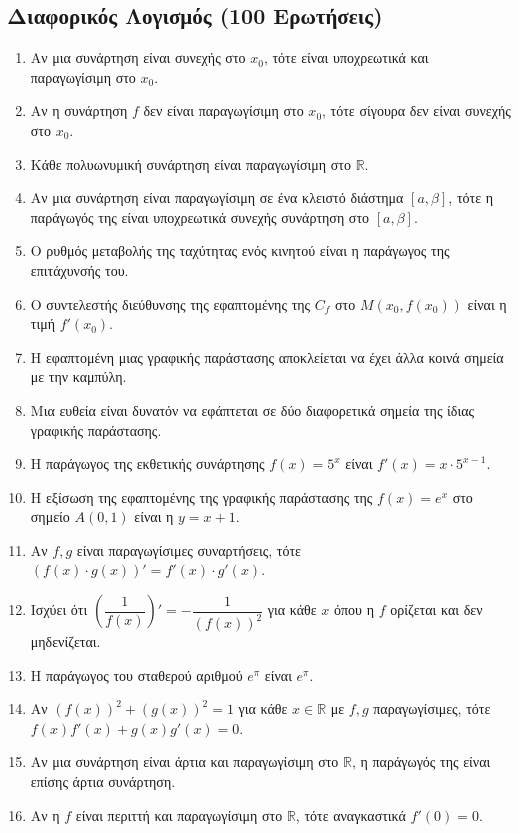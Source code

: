 \subsection{Διαφορικός Λογισμός (100 Ερωτήσεις)}
\begin{enumerate}[label=\textbf{2.\arabic*.}]
    \item Αν μια συνάρτηση είναι συνεχής στο $x_0$, τότε είναι υποχρεωτικά και παραγωγίσιμη στο $x_0$.
    \item Αν η συνάρτηση $f$ δεν είναι παραγωγίσιμη στο $x_0$, τότε σίγουρα δεν είναι συνεχής στο $x_0$.
    \item Κάθε πολυωνυμική συνάρτηση είναι παραγωγίσιμη στο $\mathbb{R}$.
    \item Αν μια συνάρτηση είναι παραγωγίσιμη σε ένα κλειστό διάστημα $[a, \beta]$, τότε η παράγωγός της είναι υποχρεωτικά συνεχής συνάρτηση στο $[a, \beta]$.
    \item Ο ρυθμός μεταβολής της ταχύτητας ενός κινητού είναι η παράγωγος της επιτάχυνσής του.
    \item Ο συντελεστής διεύθυνσης της εφαπτομένης της $C_f$ στο $M(x_0, f(x_0))$ είναι η τιμή $f'(x_0)$.
    \item Η εφαπτομένη μιας γραφικής παράστασης αποκλείεται να έχει άλλα κοινά σημεία με την καμπύλη.
    \item Μια ευθεία είναι δυνατόν να εφάπτεται σε δύο διαφορετικά σημεία της ίδιας γραφικής παράστασης.
    \item Η παράγωγος της εκθετικής συνάρτησης $f(x) = 5^x$ είναι $f'(x) = x \cdot 5^{x-1}$.
    \item Η εξίσωση της εφαπτομένης της γραφικής παράστασης της $f(x) = e^x$ στο σημείο $A(0, 1)$ είναι η $y = x + 1$.
    \item Αν $f, g$ είναι παραγωγίσιμες συναρτήσεις, τότε $(f(x) \cdot g(x))' = f'(x) \cdot g'(x)$.
    \item Ισχύει ότι $\left( \dfrac{1}{f(x)} \right)' = -\dfrac{1}{(f(x))^2}$ για κάθε $x$ όπου η $f$ ορίζεται και δεν μηδενίζεται.
    \item Η παράγωγος του σταθερού αριθμού $e^{\pi}$ είναι $e^{\pi}$.
    \item Αν $(f(x))^2 + (g(x))^2 = 1$ για κάθε $x \in \mathbb{R}$ με $f,g$ παραγωγίσιμες, τότε $f(x)f'(x) + g(x)g'(x) = 0$.
    \item Αν μια συνάρτηση είναι άρτια και παραγωγίσιμη στο $\mathbb{R}$, η παράγωγός της είναι επίσης άρτια συνάρτηση.
    \item Αν η $f$ είναι περιττή και παραγωγίσιμη στο $\mathbb{R}$, τότε αναγκαστικά $f'(0) = 0$.

\end{enumerate}
